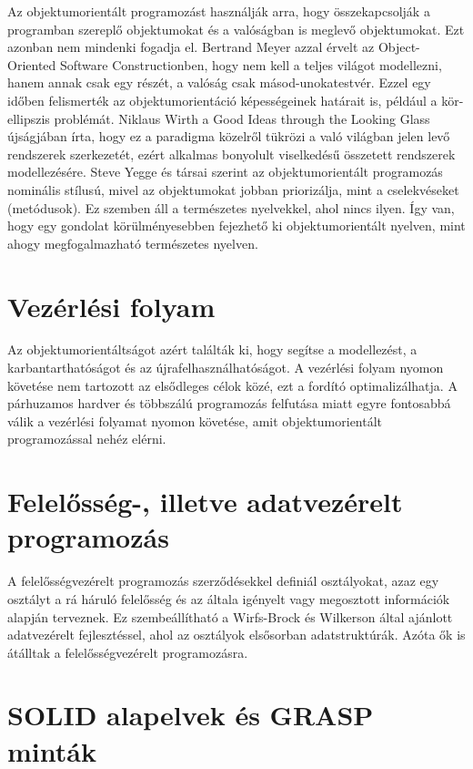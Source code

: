 \documentclass[a4paper,12pt,twoside]{report}
\theoremstyle{definition}
\begin{document}
	Az objektumorientált programozást használják arra, hogy összekapcsolják a programban szereplő objektumokat és a valóságban is meglevő objektumokat. Ezt azonban nem mindenki fogadja el. Bertrand Meyer azzal érvelt az Object-Oriented Software Constructionben, hogy nem kell a teljes világot modellezni, hanem annak csak egy részét, a valóság csak másod-unokatestvér. Ezzel egy időben felismerték az objektumorientáció képességeinek határait is, például a kör-ellipszis problémát.
	Niklaus Wirth a Good Ideas through the Looking Glass újságjában írta, hogy ez a paradigma közelről tükrözi a való világban jelen levő rendszerek szerkezetét, ezért alkalmas bonyolult viselkedésű összetett rendszerek modellezésére.
	Steve Yegge és társai szerint az objektumorientált programozás nominális stílusú, mivel az objektumokat jobban priorizálja, mint a cselekvéseket (metódusok). Ez szemben áll a természetes nyelvekkel, ahol nincs ilyen. Így van, hogy egy gondolat körülményesebben fejezhető ki objektumorientált nyelven, mint ahogy megfogalmazható természetes nyelven.
	
	\section{Vezérlési folyam}
	
	Az objektumorientáltságot azért találták ki, hogy segítse a modellezést, a karbantarthatóságot és az újrafelhasználhatóságot. A vezérlési folyam nyomon követése nem tartozott az elsődleges célok közé, ezt a fordító optimalizálhatja. A párhuzamos hardver és többszálú programozás felfutása miatt egyre fontosabbá válik a vezérlési folyamat nyomon követése, amit objektumorientált programozással nehéz elérni.
	
	\section{Felelősség-, illetve adatvezérelt programozás}
	
	A felelősségvezérelt programozás szerződésekkel definiál osztályokat, azaz egy osztályt a rá háruló felelősség és az általa igényelt vagy megosztott információk alapján terveznek. Ez szembeállítható a Wirfs-Brock és Wilkerson által ajánlott adatvezérelt fejlesztéssel, ahol az osztályok elsősorban adatstruktúrák. Azóta ők is átálltak a felelősségvezérelt programozásra.
	
	\section{SOLID alapelvek és GRASP minták}
	
\end{document}
